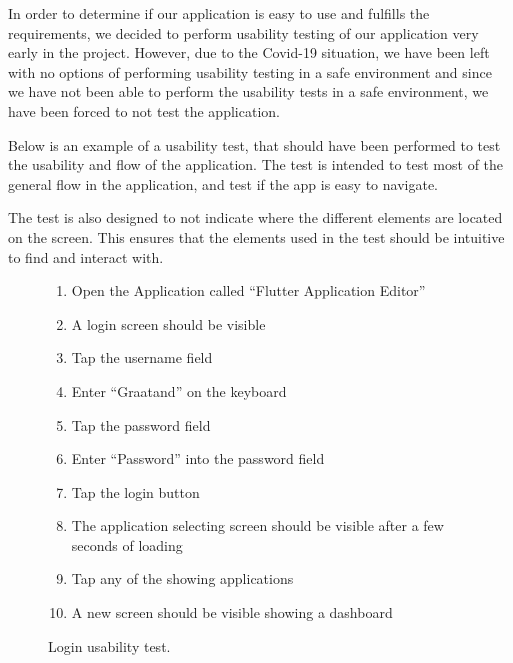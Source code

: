In order to determine if our application is easy to use and fulfills the requirements, we decided to perform usability testing of our application very early in the project.
However, due to the Covid-19 situation, we have been left with no options of performing usability testing in a safe environment and since we have not been able to perform the usability tests in a safe environment, we have been forced to not test the application.

Below is an example of a usability test, that should have been performed to test the usability and flow of the application. 
The test is intended to test most of the general flow in the application, and test if the app is easy to navigate. 

The test is also designed to not indicate where the different elements are located on the screen.
This ensures that the elements used in the test should be intuitive to find and interact with. 



\begin{figure}[H]
    \begin{enumerate}
        \item Open the Application called “Flutter Application Editor”
        \item A login screen should be visible
        \item Tap the username field
        \item Enter “Graatand” on the keyboard
        \item Tap the password field
        \item Enter “Password” into the password field
        \item Tap the login button
        \item The application selecting screen should be visible after a few seconds of loading
        \item Tap any of the showing applications
        \item A new screen should be visible showing a dashboard
    \end{enumerate}
    \caption{Login usability test.}
    \label{loginUsabilityTest}
\end{figure}

